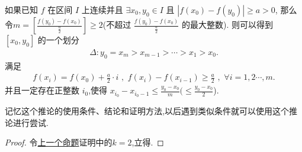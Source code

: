 \documentclass[lang=cn,newtx,10pt,scheme=chinese]{../Template/elegantbook}
\begin{document}
\begin{corollary}\label{cor::连续函数在固定的两点之间寻找充分近的两点,同时保持两点函数值之差足够大}
    如果已知 \(f\) 在区间 \(I\) 上连续并且 \(\exists x_0,y_0\in I\) 且 \(\left| f\left( x_0 \right) -f\left( y_0 \right) \right|\geq a>0\),
    那么令\(m=\left[ \frac{f\left( y_0 \right) -f\left( x_0 \right)}{\frac{a}{2}} \right]\geq 2\)(不超过 \(\frac{f\left( y_0 \right) -f\left( x_0 \right)}{\frac{a}{2}}\) 的最大整数).
则可以得到 \(\left[ x_0,y_0 \right]\) 的一个划分 
\begin{align*}
\Delta :y_0=x_m>x_{m - 1}>\cdots >x_1>x_0.
\end{align*}
满足 \begin{align*}
    f\left( x_i \right) = f\left( x_0 \right) + \frac{a}{2}\cdot i\,\,,\,\,f\left( x_i \right) - f\left( x_{i - 1} \right) \geq \frac{a}{2}\,\,,\,\,\forall i = 1,2\cdots,m.
\end{align*}
并且一定存在正整数 \(i_0\),使得 \(x_{i_0}-x_{i_0 - 1}\leq \frac{y_0 - x_0}{m}(\leq \frac{y_0 - x_0}{2}\)).
\end{corollary}
\begin{remark}
    记忆这个推论的使用条件、结论和证明方法,以后遇到类似条件就可以使用这个推论进行尝试.
\end{remark}
\begin{proof}
    令\hyperref[pro:连续函数在固定的两点之间寻找充分近的两点,同时保持两点函数值之差足够大]{上一个命题}证明中的$k=2$,立得.
\end{proof}
\end{document}
